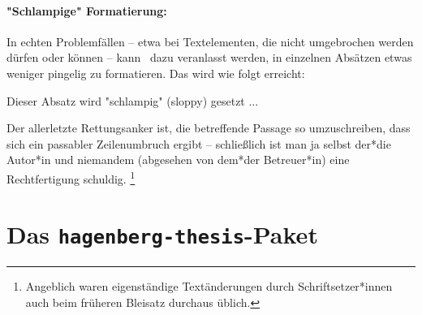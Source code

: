 \paragraph{"Schlampige" Formatierung:} In echten Problemfällen -- etwa bei
Textelementen, die nicht umgebrochen werden dürfen oder können -- kann
\latex\ dazu veranlasst werden, in einzelnen Absätzen etwas weniger pingelig
zu formatieren. Das wird wie folgt erreicht:
%
\begin{LaTeXCode}[numbers=none]
\begin{sloppypar}
	Dieser Absatz wird "schlampig" (sloppy) gesetzt ...
\end{sloppypar}
\end{LaTeXCode}
%
Der allerletzte Rettungsanker ist, die betreffende Passage so umzuschreiben,
dass sich ein passabler Zeilenumbruch ergibt -- schließlich ist man ja selbst
der*die Autor*in und niemandem (abgesehen von dem*der Betreuer*in) eine
Rechtfertigung schuldig.%
\footnote{Angeblich waren eigenständige Textänderungen durch Schriftsetzer*innen
auch beim früheren Bleisatz durchaus üblich.}


\section{Das \texttt{hagenberg-thesis}-Paket}


